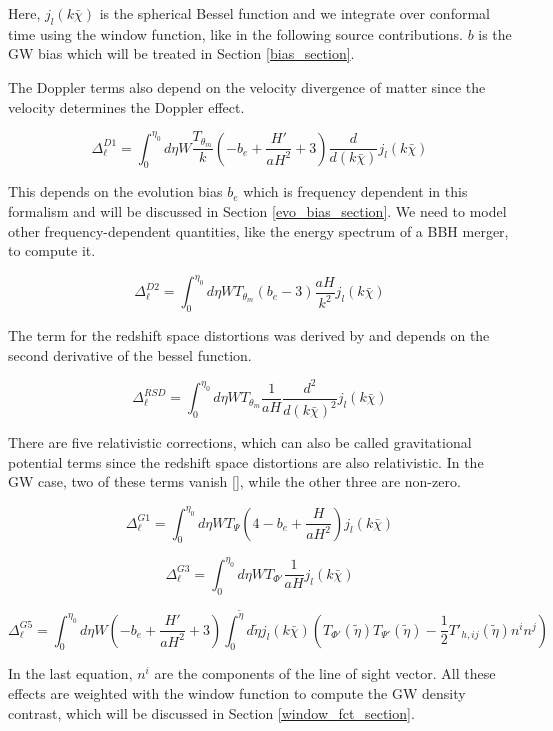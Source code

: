 Here, $j_l(k \bar{\chi})$ is the spherical Bessel function and we integrate over conformal time using the window function, like in the following source contributions. $b$ is the GW bias which will be treated in Section \ref{bias_section}.

The Doppler terms also depend on the velocity divergence of matter since the velocity determines the Doppler effect.

\begin{equation}
    \Delta_\ell^{D1}=\int_0^{\eta_0} d\eta W \frac{T_{\theta_m}}{k} \left(-b_e + \frac{H'}{aH^2}+3\right)\frac{d}{d(k\bar{\chi})} j_l(k \bar{\chi})
\end{equation}

This depends on the evolution bias $b_e$ which is frequency dependent in this formalism and will be discussed in Section \ref{evo_bias_section}. We need to model other frequency-dependent quantities, like the energy spectrum of a BBH merger, to compute it.

\begin{equation}
    \Delta_\ell^{D2}=\int_0^{\eta_0} d\eta W T_{\theta_m}(b_e-3) \frac{aH}{k^2} j_l(k \bar{\chi})
\end{equation}

The term for the redshift space distortions was derived by \cite{kaiser_clustering_1987} and depends on the second derivative of the bessel function.

\begin{equation}
    \Delta_\ell^{RSD}=\int_0^{\eta_0} d\eta W T_{\theta_m} \frac{1}{aH}\frac{d^2}{d(k\bar{\chi})^2} j_l(k \bar{\chi})
\end{equation}

There are five relativistic corrections, which can also be called gravitational potential terms since the redshift space distortions are also relativistic. In the GW case, two of these terms vanish [\cite{dallarmi_dipole_2022}], while the other three are non-zero.

\begin{equation}
    \Delta_\ell^{G1}=\int_0^{\eta_0} d\eta W T_\Psi \left(4-b_e+\frac{H}{aH^2}\right) j_l(k \bar{\chi})
\end{equation}

\begin{equation}
    \Delta_\ell^{G3}=\int_0^{\eta_0} d\eta W T_{\Phi'} \frac{1}{aH} j_l(k \bar{\chi})
\end{equation}

\begin{equation}
    \Delta_\ell^{G5}=\int_0^{\eta_0} d\eta W \left(-b_e + \frac{H'}{aH^2} +3\right) \int_0^{\tilde{\eta}} d\tilde{\eta} j_l(k \bar{\chi}) \left( T_{\Phi'}(\tilde{\eta})T_{\Psi'}(\tilde{\eta})-\frac{1}{2}T'_{h, ij}(\tilde{\eta})n^i n^j \right)
\end{equation}

In the last equation, $n^i$ are the components of the line of sight vector.
All these effects are weighted with the window function to compute the GW density contrast, which will be discussed in Section \ref{window_fct_section}.

